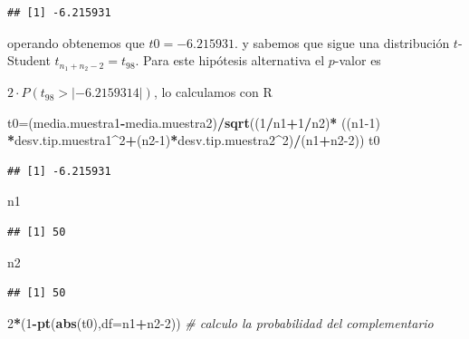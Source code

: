 \documentclass[
]{article}
\newenvironment{Shaded}{\begin{snugshade}}{\end{snugshade}}
\newcommand{\CommentTok}[1]{\textcolor[rgb]{0.56,0.35,0.01}{\textit{#1}}}
\newcommand{\DataTypeTok}[1]{\textcolor[rgb]{0.13,0.29,0.53}{#1}}
\newcommand{\DecValTok}[1]{\textcolor[rgb]{0.00,0.00,0.81}{#1}}
\newcommand{\KeywordTok}[1]{\textcolor[rgb]{0.13,0.29,0.53}{\textbf{#1}}}
\newcommand{\NormalTok}[1]{#1}
\newcommand{\OperatorTok}[1]{\textcolor[rgb]{0.81,0.36,0.00}{\textbf{#1}}}
\newcommand{\StringTok}[1]{\textcolor[rgb]{0.31,0.60,0.02}{#1}}
\begin{document}
\begin{verbatim}
## [1] -6.215931
\end{verbatim}

operando obtenemos que \(t0=-6.215931.\) y sabemos que sigue una
distribución \(t\)-Student \(t_{n_1+n_2-2}=t_{98}\). Para este hipótesis
alternativa el \(p\)-valor es

\(2\cdot P(t_{98}>|-6.2159314|)\), lo calculamos con R

\begin{Shaded}
\begin{Highlighting}[]
\NormalTok{t0=(media.muestra1}\OperatorTok{{-}}\NormalTok{media.muestra2)}\OperatorTok{/}\KeywordTok{sqrt}\NormalTok{((}\DecValTok{1}\OperatorTok{/}\NormalTok{n1}\OperatorTok{+}\DecValTok{1}\OperatorTok{/}\NormalTok{n2)}\OperatorTok{*}\StringTok{ }
\NormalTok{((n1}\DecValTok{{-}1}\NormalTok{) }\OperatorTok{*}\NormalTok{desv.tip.muestra1}\OperatorTok{\^{}}\DecValTok{2}\OperatorTok{+}\NormalTok{(n2}\DecValTok{{-}1}\NormalTok{)}\OperatorTok{*}\NormalTok{desv.tip.muestra2}\OperatorTok{\^{}}\DecValTok{2}\NormalTok{)}\OperatorTok{/}\NormalTok{(n1}\OperatorTok{+}\NormalTok{n2}\DecValTok{{-}2}\NormalTok{))}
\NormalTok{t0}
\end{Highlighting}
\end{Shaded}

\begin{verbatim}
## [1] -6.215931
\end{verbatim}

\begin{Shaded}
\begin{Highlighting}[]
\NormalTok{n1}
\end{Highlighting}
\end{Shaded}

\begin{verbatim}
## [1] 50
\end{verbatim}

\begin{Shaded}
\begin{Highlighting}[]
\NormalTok{n2}
\end{Highlighting}
\end{Shaded}

\begin{verbatim}
## [1] 50
\end{verbatim}

\begin{Shaded}
\begin{Highlighting}[]
\DecValTok{2}\OperatorTok{*}\NormalTok{(}\DecValTok{1}\OperatorTok{{-}}\KeywordTok{pt}\NormalTok{(}\KeywordTok{abs}\NormalTok{(t0),}\DataTypeTok{df=}\NormalTok{n1}\OperatorTok{+}\NormalTok{n2}\DecValTok{{-}2}\NormalTok{)) }\CommentTok{\# calculo la probabilidad del complementario}
\end{Highlighting}
\end{Shaded}
\end{document}

